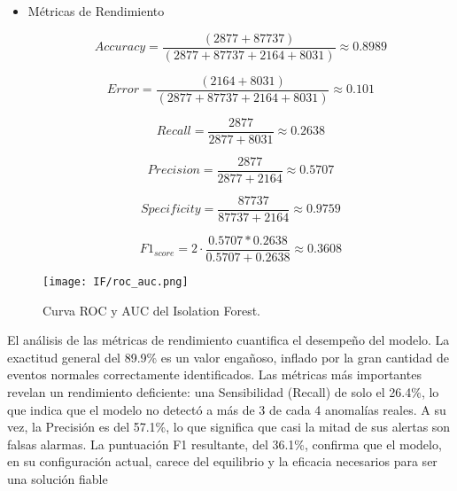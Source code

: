 \begin{itemize}
      \item Métricas de Rendimiento

            $$Accuracy = \frac{(2877+87737)}{(2877+87737+2164+8031)}\approx 0.8989$$

            $$Error = \frac{(2164+8031)}{(2877+87737+2164+8031)}\approx 0.101$$

            $$Recall = \frac{2877}{2877+8031}\approx 0.2638$$

            $$Precision = \frac{2877}{2877+2164}\approx 0.5707$$

            $$Specificity = \frac{87737}{87737+2164}\approx 0.9759$$

            $$F1_{score} = 2 \cdot \frac{0.5707 * 0.2638}{0.5707+0.2638} \approx 0.3608$$

\end{itemize}

\begin{figure}[ht!]
      \centering
      \texttt{[image: IF/roc\_auc.png]}
      \caption{Curva ROC y AUC del Isolation Forest.}
      \label{fig:roc_if}
\end{figure}

El análisis de las métricas de rendimiento cuantifica el desempeño del modelo. La exactitud general del 89.9\% es un valor engañoso, inflado por la gran cantidad de eventos normales correctamente identificados. Las métricas más importantes revelan un rendimiento deficiente: una Sensibilidad (Recall) de solo el 26.4\%, lo que indica que el modelo no detectó a más de 3 de cada 4 anomalías reales. A su vez, la Precisión es del 57.1\%, lo que significa que casi la mitad de sus alertas son falsas alarmas. La puntuación F1 resultante, del 36.1\%, confirma que el modelo, en su configuración actual, carece del equilibrio y la eficacia necesarios para ser una solución fiable
